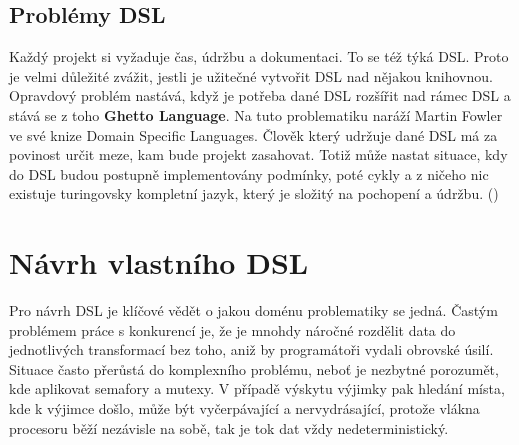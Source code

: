 \documentclass[male,czech]{kithesis}
\begin{document}
{\begin{center}
\end{center}
}

\section{Problémy DSL}

Každý projekt si vyžaduje čas, údržbu a dokumentaci.
To se též týká DSL.
Proto je velmi důležité zvážit, 
jestli je užitečné vytvořit DSL nad nějakou knihovnou.
Opravdový problém nastává, 
když je potřeba dané DSL rozšířit nad rámec DSL a
stává se z toho \textbf{Ghetto Language}.
Na tuto problematiku naráží Martin Fowler ve své knize Domain Specific Languages.
Člověk který udržuje dané DSL má za povinost určit meze,
kam bude projekt zasahovat. 
Totiž může nastat situace,
kdy do DSL budou postupně implementovány podmínky,
poté cykly a 
z ničeho nic existuje turingovsky kompletní jazyk, 
který je složitý na pochopení a údržbu. (\cite[s.~38-39]{Fowlerc2011})


\chapter{Návrh vlastního DSL}

Pro návrh DSL je klíčové vědět o jakou doménu problematiky se jedná.
Častým problémem práce s konkurencí je, 
že je mnohdy náročné rozdělit data do jednotlivých transformací bez toho, 
aniž by programátoři vydali obrovské úsilí.
Situace často přerůstá do komplexního problému, 
neboť je nezbytné porozumět, 
kde aplikovat semafory a mutexy. 
V případě výskytu výjimky pak hledání místa, 
kde k výjimce došlo, 
může být vyčerpávající a nervydrásající,
protože vlákna procesoru běží nezávisle na sobě,
tak je tok dat vždy nedeterministický.
\end{document}
